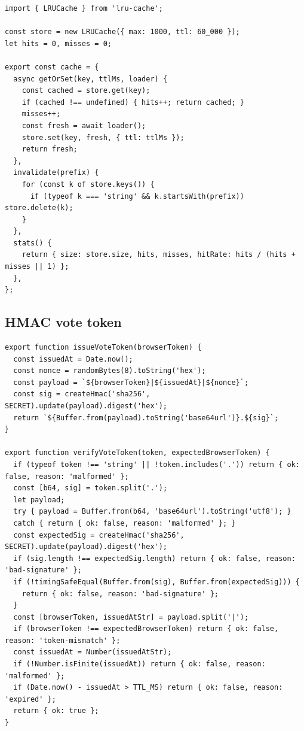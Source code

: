\begin{lstlisting}[caption={\texttt{server/utils/cache.js}},label={lst:cache}]
import { LRUCache } from 'lru-cache';

const store = new LRUCache({ max: 1000, ttl: 60_000 });
let hits = 0, misses = 0;

export const cache = {
  async getOrSet(key, ttlMs, loader) {
    const cached = store.get(key);
    if (cached !== undefined) { hits++; return cached; }
    misses++;
    const fresh = await loader();
    store.set(key, fresh, { ttl: ttlMs });
    return fresh;
  },
  invalidate(prefix) {
    for (const k of store.keys()) {
      if (typeof k === 'string' && k.startsWith(prefix)) store.delete(k);
    }
  },
  stats() {
    return { size: store.size, hits, misses, hitRate: hits / (hits + misses || 1) };
  },
};
\end{lstlisting}

\subsection{HMAC vote token}

\begin{lstlisting}[caption={\texttt{server/utils/voteToken.js} (issue + verify)},label={lst:vote-token}]
export function issueVoteToken(browserToken) {
  const issuedAt = Date.now();
  const nonce = randomBytes(8).toString('hex');
  const payload = `${browserToken}|${issuedAt}|${nonce}`;
  const sig = createHmac('sha256', SECRET).update(payload).digest('hex');
  return `${Buffer.from(payload).toString('base64url')}.${sig}`;
}

export function verifyVoteToken(token, expectedBrowserToken) {
  if (typeof token !== 'string' || !token.includes('.')) return { ok: false, reason: 'malformed' };
  const [b64, sig] = token.split('.');
  let payload;
  try { payload = Buffer.from(b64, 'base64url').toString('utf8'); }
  catch { return { ok: false, reason: 'malformed' }; }
  const expectedSig = createHmac('sha256', SECRET).update(payload).digest('hex');
  if (sig.length !== expectedSig.length) return { ok: false, reason: 'bad-signature' };
  if (!timingSafeEqual(Buffer.from(sig), Buffer.from(expectedSig))) {
    return { ok: false, reason: 'bad-signature' };
  }
  const [browserToken, issuedAtStr] = payload.split('|');
  if (browserToken !== expectedBrowserToken) return { ok: false, reason: 'token-mismatch' };
  const issuedAt = Number(issuedAtStr);
  if (!Number.isFinite(issuedAt)) return { ok: false, reason: 'malformed' };
  if (Date.now() - issuedAt > TTL_MS) return { ok: false, reason: 'expired' };
  return { ok: true };
}
\end{lstlisting}

